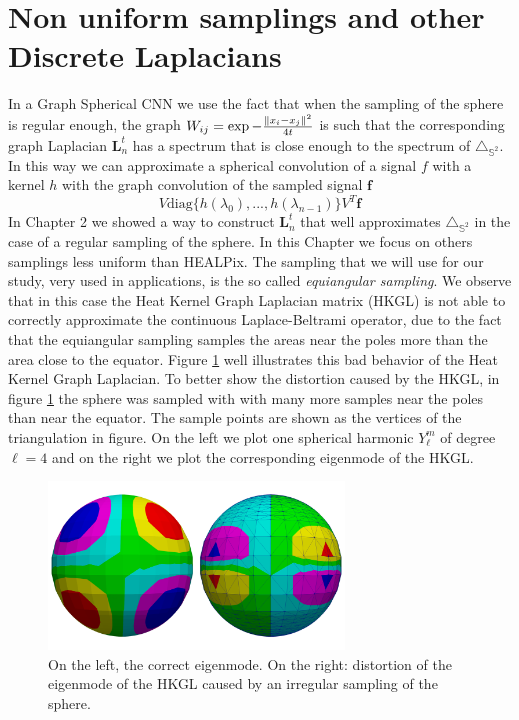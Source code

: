 

\section{Non uniform samplings and other Discrete Laplacians}

In a Graph Spherical CNN we use the fact that when the sampling of the sphere is regular enough, the graph $W_{i j} = \exp {-\frac{\left\lVert x_i-x_j\right\rVert^2}{4t}}$ is such that the corresponding graph Laplacian $\mathbf L_n^t$ has a spectrum that is close enough to the spectrum of $\triangle_{\mathbb S^2}$. In this way we can approximate a spherical convolution of a signal $f$ with a kernel $h$ with the graph convolution of the sampled signal $\mathbf f$
$$
V\text{diag}\{h(\lambda_0), ..., h(\lambda_{n-1})\}V^T\mathbf f
$$
In Chapter 2 we showed a way to construct $\mathbf L_n^t$ that well approximates $\triangle_{\mathbb S^2}$ in the case of a regular sampling of the sphere. In this Chapter we focus on others samplings less uniform than HEALPix. The sampling that we will use for our study, very used in applications, is the so called \textit{equiangular sampling}. We observe that in this case the Heat Kernel Graph Laplacian matrix (HKGL) is not able to correctly approximate the continuous Laplace-Beltrami operator, due to the fact that the equiangular sampling samples the areas near the poles more than the area close to the equator. Figure \ref{fig:equiangular distortion} well illustrates this bad behavior of the Heat Kernel Graph Laplacian. To better show the distortion caused by the HKGL, in figure \ref{fig:equiangular distortion} the sphere was sampled with with many more samples near the poles than near the equator. The sample points are shown as the vertices of the triangulation in figure. On the left we plot one spherical harmonic $Y_\ell^m$ of degree $\ell=4$ and on the right we plot the corresponding eigenmode of the HKGL. 
\begin{figure}[h]
	\begin{center}
		\includegraphics[width=0.7\textwidth]{../codes/04.imbalanced/img/confront_mixed.png}
	\end{center}
	\caption{\label{fig:equiangular distortion}On the left, the correct eigenmode. On the right: distortion of the eigenmode of the HKGL caused by an irregular sampling of the sphere.}
\end{figure}
